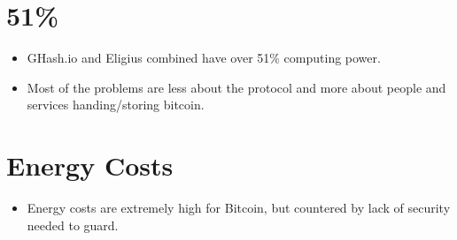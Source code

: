 \documentclass{article}
\begin{document}
\section*{51\%}
\begin{itemize}
  \item GHash.io and Eligius combined have over 51\% computing power.
  \item Most of the problems are less about the protocol and more about people and services handing/storing bitcoin.
\end{itemize}

\section*{Energy Costs}
\begin{itemize}
  \item Energy costs are extremely high for Bitcoin, but countered by lack of security needed to guard.
\end{itemize}
\end{document}
